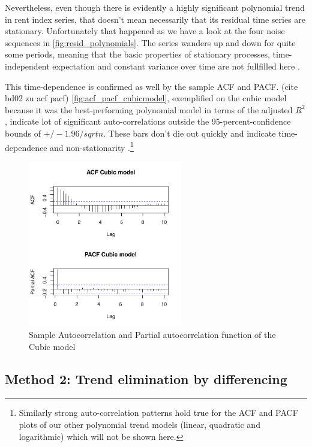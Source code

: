 \documentclass[11pt,a4paper]{article}
\begin{document}
Nevertheless, even though there is evidently a highly significant polynomial trend in rent index series, that doesn't mean necessarily that its residual time series are stationary.
Unfortunately that happened as we have a look at the four noise sequences in \cref{fig:resid_polynomials}.
The series wanders up and down for quite some periods, meaning that the basic properties of stationary processes, time-independent expectation and constant variance over time are not fullfilled here \cite[p.~49]{bd02}.

This time-dependence is confirmed as well by the sample ACF and PACF.
(cite bd02 zu acf pacf) \cref{fig:acf_pacf_cubicmodel}, exemplified on the cubic model because it was the best-performing polynomial model in terms of the adjusted $R^2$, indicate lot of significant auto-correlations outside the 95-percent-confidence bounds of $+/-1.96/sqrt{n}$.
These bars don't die out quickly and indicate time-dependence and non-stationarity \cite[p.~21]{bd02}.\footnote{
    Similarly strong auto-correlation patterns hold true for the ACF and PACF plots of our other polynomial trend models (linear, quadratic and logarithmic) which will not be shown here.
}


\begin{figure}
    \centering
    \includegraphics[angle=0,width=0.6\textwidth]{acf_pacf_cubicmodel}
    \caption{Sample Autocorrelation and Partial autocorrelation function of the Cubic model}
    \label{fig:acf_cubicmodel}
\end{figure}


\subsection{Method 2: Trend elimination by differencing}
\end{document}
